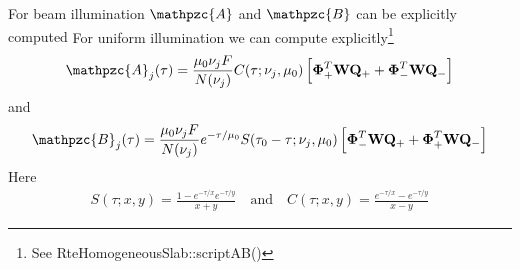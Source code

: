 \documentclass[14]{beamer}
\newcommand{\mvec}[1]{\mathbf{#1}}
\newcommand{\gvec}[1]{\boldsymbol{#1}}
\newcommand{\script}[1]{\mathpzc{#1}}
\begin{document}
\begin{frame}{For beam illumination $\script{A}$ and $\script{B}$ can
    be explicitly computed}
  For uniform illumination we can compute explicitly\footnote{See
    RteHomogeneousSlab::scriptAB()}
  \begin{align}
    \script{A}_j(\tau) = \frac{\mu_0 \nu_j F}{N(\nu_j)}
    C(\tau ; \nu_j, \mu_0)
    \left[
      \gvec{\Phi}_+^T \mvec{W} \mvec{Q}_+ +
      \gvec{\Phi}_-^T \mvec{W} \mvec{Q}_-
    \right]
  \end{align}
  and
  \begin{align}
    \script{B}_j(\tau) = \frac{\mu_0 \nu_j F}{N(\nu_j)}
    e^{-\tau/\mu_0}S(\tau_0-\tau ; \nu_j, \mu_0)
    \left[
      \gvec{\Phi}_-^T \mvec{W} \mvec{Q}_+ +
      \gvec{\Phi}_+^T \mvec{W} \mvec{Q}_-
    \right]
  \end{align}
  Here
  \begin{align}
    S(\tau;x,y) = \frac{1-e^{-\tau/x}e^{-\tau/y}}{x+y} \quad\textrm{and}\quad
    C(\tau;x,y) = \frac{e^{-\tau/x}-e^{-\tau/y}}{x-y}
  \end{align}
\end{frame}
\end{document}
